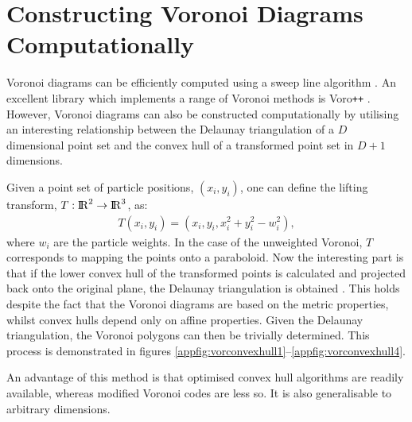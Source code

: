 \chapter[Constructing Voronoi Diagrams Computationally]{Constructing Voronoi Diagrams Computationally}
\label{app:vorchull}

Voronoi diagrams can be efficiently computed using a sweep line algorithm \cite{Fortune1987}.
An excellent library which implements a range of Voronoi methods is Voro\texttt{++} \cite{Rycroft2009}.
However, Voronoi diagrams can also be constructed computationally by utilising an interesting relationship between the Delaunay triangulation of a $D$ dimensional point set and the convex hull of a transformed point set in $D+1$ dimensions.

Given a \td{} point set of particle positions, $\left(x_i,y_i\right)$, one can define the lifting transform, $T : {\rm I\!R}^2\rightarrow {\rm I\!R}^3$, as:
\begin{align}
	T\left(x_i,y_i\right) = \left(x_i,y_i,x_i^2+y_i^2-w_i^2\right),
\end{align}
where $w_i$ are the particle weights.
In the case of the unweighted Voronoi, $T$ corresponds to mapping the points onto a paraboloid.
Now the interesting part is that if the lower convex hull of the transformed points is calculated and projected back onto the original plane, the Delaunay triangulation is obtained \cite{Aurenhammer1987,Okabe1992}.
This holds despite the fact that the Voronoi diagrams are based on the metric properties, whilst convex hulls depend only on affine properties.
Given the Delaunay triangulation, the Voronoi polygons can then be trivially determined.
This process is demonstrated in figures \ref{appfig:vorconvexhull1}--\ref{appfig:vorconvexhull4}.

An advantage of this method is that optimised convex hull algorithms are readily available, whereas modified Voronoi codes are less so.
It is also generalisable to arbitrary dimensions.

